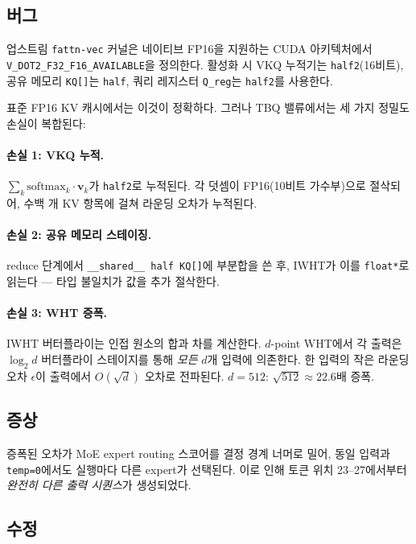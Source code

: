 \documentclass[10pt,twocolumn]{article}
\begin{document}
\subsection{버그}

업스트림 \texttt{fattn-vec} 커널은 네이티브 FP16을 지원하는 CUDA 아키텍처에서 \texttt{V\_DOT2\_F32\_F16\_AVAILABLE}을 정의한다. 활성화 시 VKQ 누적기는 \texttt{half2}(16비트), 공유 메모리 \texttt{KQ[]}는 \texttt{half}, 쿼리 레지스터 \texttt{Q\_reg}는 \texttt{half2}를 사용한다.

표준 FP16 KV 캐시에서는 이것이 정확하다. 그러나 TBQ 밸류에서는 세 가지 정밀도 손실이 복합된다:

\paragraph{손실 1: VKQ 누적.} $\sum_k \text{softmax}_k \cdot \mathbf{v}_k$가 \texttt{half2}로 누적된다. 각 덧셈이 FP16(10비트 가수부)으로 절삭되어, 수백 개 KV 항목에 걸쳐 라운딩 오차가 누적된다.

\paragraph{손실 2: 공유 메모리 스테이징.} reduce 단계에서 \texttt{\_\_shared\_\_ half KQ[]}에 부분합을 쓴 후, IWHT가 이를 \texttt{float*}로 읽는다 — 타입 불일치가 값을 추가 절삭한다.

\paragraph{손실 3: WHT 증폭.} IWHT 버터플라이는 인접 원소의 합과 차를 계산한다. $d$-point WHT에서 각 출력은 $\log_2 d$ 버터플라이 스테이지를 통해 \emph{모든} $d$개 입력에 의존한다. 한 입력의 작은 라운딩 오차 $\epsilon$이 출력에서 $O(\sqrt{d})$ 오차로 전파된다. $d=512$: $\sqrt{512} \approx 22.6$배 증폭.

\subsection{증상}

증폭된 오차가 MoE expert routing 스코어를 결정 경계 너머로 밀어, 동일 입력과 \texttt{temp=0}에서도 실행마다 다른 expert가 선택된다. 이로 인해 토큰 위치 23--27에서부터 \emph{완전히 다른 출력 시퀀스}가 생성되었다.

\subsection{수정}
\end{document}
